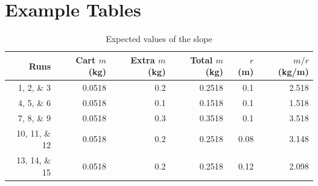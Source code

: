 \section{Example Tables}
%
\begin{table}[ht!]
    \begin{center}
        \begin{tabular}{r | r | r | r | r | r}
            \textbf{Runs} & Cart $m$ (kg) & Extra $m$ (kg) & Total $m$ (kg) & $r$ (m) & $m/r$ (kg/m) \\
            \hline
            1, 2, \& 3 & 0.0518 & 0.2 & 0.2518 & 0.1 & 2.518 \\
            4, 5, \& 6 & 0.0518 & 0.1 & 0.1518 & 0.1 & 1.518 \\
            7, 8, \& 9 & 0.0518 & 0.3 & 0.3518 & 0.1 & 3.518 \\
            10, 11, \& 12 & 0.0518 & 0.2 & 0.2518 & 0.08 & 3.148 \\
            13, 14, \& 15 & 0.0518 & 0.2 & 0.2518 & 0.12 & 2.098 \\
            \hline
        \end{tabular}
    \end{center}
    \caption{Expected values of the slope}
    \label{table:06.centripetal.slopes}
\end{table}
%
